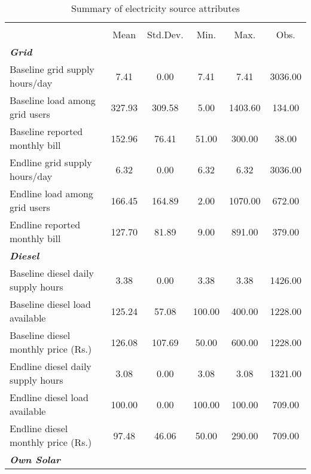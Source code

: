 \begin{table}[htbp]\centering
\def\sym#1{\ifmmode^{#1}\else\(^{#1}\)\fi}
\caption{Summary of electricity source attributes\label {tab1}}
\begin{tabular}{l*{1}{ccccc}}
\toprule
                    &\multicolumn{5}{c}{}                                            \\
                    &\multicolumn{1}{c}{{Mean}}&\multicolumn{1}{c}{{Std.Dev.}}&\multicolumn{1}{c}{{Min.}}&\multicolumn{1}{c}{{Max.}}&\multicolumn{1}{c}{{Obs.}}\\
\midrule
\textbf{\emph{Grid}}&            &            &            &            &            \\
Baseline grid supply hours/day&        7.41&        0.00&        7.41&        7.41&     3036.00\\
Baseline load among grid users&      327.93&      309.58&        5.00&     1403.60&      134.00\\
Baseline reported monthly bill&      152.96&       76.41&       51.00&      300.00&       38.00\\
Endline grid supply hours/day&        6.32&        0.00&        6.32&        6.32&     3036.00\\
Endline load among grid users&      166.45&      164.89&        2.00&     1070.00&      672.00\\
Endline reported monthly bill&      127.70&       81.89&        9.00&      891.00&      379.00\\
\textbf{\emph{Diesel}}&            &            &            &            &            \\
Baseline diesel daily supply hours&        3.38&        0.00&        3.38&        3.38&     1426.00\\
Baseline diesel load available&      125.24&       57.08&      100.00&      400.00&     1228.00\\
Baseline diesel monthly price (Rs.)&      126.08&      107.69&       50.00&      600.00&     1228.00\\
Endline diesel daily supply hours&        3.08&        0.00&        3.08&        3.08&     1321.00\\
Endline diesel load available&      100.00&        0.00&      100.00&      100.00&      709.00\\
Endline diesel monthly price (Rs.)&       97.48&       46.06&       50.00&      290.00&      709.00\\
\textbf{\emph{Own Solar}}&            &            &            &            &            \\

\end{tabular}
\end{table}
